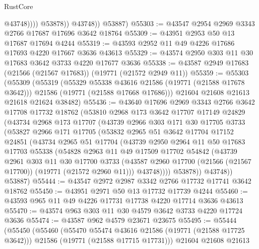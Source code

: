 \begin{lexlean}{RustCore}
\begin{coremodule}
                      @43748))))
              @53878))
          @43748))
      @53887)
@55303 := @43547 @2954 @2969 @3343 @2766 @17687 @17696 @3642 @18764
@55309 := @43951 @2953 @50 @13 @17687 @17694 @4244
@55319 := @43593 @2952 @11 @49 @4226 @17686 @17693 @4220 @17667 @3636 @43613
@55329 := @43574 @2950 @303 @11 @30 @17683 @3642 @3733 @4220 @17677 @3636
@55338 := @43587 @2949 @17683 (@21566 (@21567 @17683)) (@19771 (@21572 @2949 @11))
@55359 := @55303
    (@55309
      (@55319
        (@55329 @55338 @43616 @21586 (@19771 (@21588 @17678 @3642)))
        @21586
        (@19771 (@21588 @17668 @17686)))
      @21604
      @21608
      @21613
      @21618
      @21624
      @38482)
@55436 := @43640
    @17696
    @2969
    @3343
    @2766
    @3642
    @17708
    @17732
    @18762
    (@53810
      @2968
      @173
      @3642
      @17707
      @17149
      @24829
      (@43734
        @2968
        @173
        @17707
        (@43739
          @2966
          @303
          @171
          @30
          @17705
          @3733
          (@53827
            @2966
            @171
            @17705
            (@53832
              @2965
              @51
              @3642
              @17704
              @17152
              @24851
              (@43734
                @2965
                @51
                @17704
                (@43739
                  @2950
                  @2964
                  @11
                  @50
                  @17683
                  @17703
                  @55338
                  (@54828
                    @2963
                    @11
                    @49
                    @17509
                    @17702
                    @54842
                    (@43739
                      @2961
                      @303
                      @11
                      @30
                      @17700
                      @3733
                      (@43587 @2960 @17700 (@21566 (@21567 @17700)) (@19771 (@21572 @2960 @11)))
                      @43748))))
              @53878))
          @43748))
      @53887)
@55444 := @43547 @2972 @2987 @3342 @2766 @17732 @17741 @3642 @18762
@55450 := @43951 @2971 @50 @13 @17732 @17739 @4244
@55460 := @43593 @965 @11 @49 @4226 @17731 @17738 @4220 @17714 @3636 @43613
@55470 := @43574 @963 @303 @11 @30 @4579 @3642 @3733 @4220 @17724 @3636
@55474 := @43587 @962 @4579 @23671 @23675
@55495 := @55444
    (@55450
      (@55460
        (@55470 @55474 @43616 @21586 (@19771 (@21588 @17725 @3642)))
        @21586
        (@19771 (@21588 @17715 @17731)))
      @21604
      @21608
      @21613

\end{coremodule}
\end{lexlean}
